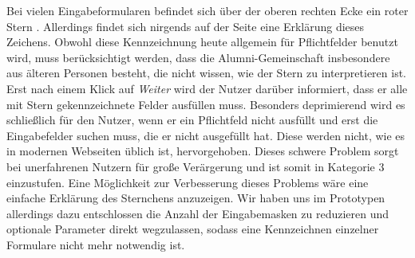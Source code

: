 { Bei vielen Eingabeformularen befindet sich über der oberen rechten Ecke ein roter Stern \glqq *\grqq. Allerdings findet sich nirgends auf der Seite eine Erklärung dieses Zeichens.
Obwohl diese Kennzeichnung heute allgemein für Pflichtfelder benutzt wird, muss berücksichtigt werden, dass die Alumni-Gemeinschaft insbesondere aus älteren Personen besteht, die nicht wissen, wie der Stern zu interpretieren ist. Erst nach einem Klick auf \emph{Weiter} wird der Nutzer darüber informiert, dass er alle mit Stern gekennzeichnete Felder ausfüllen muss.
}
{ Besonders deprimierend wird es schließlich für den Nutzer, wenn er ein Pflichtfeld nicht ausfüllt und erst die Eingabefelder suchen muss, die er nicht ausgefüllt hat. Diese werden nicht, wie es in modernen Webseiten üblich ist, hervorgehoben. Dieses schwere Problem sorgt bei unerfahrenen Nutzern für große Verärgerung und ist somit in Kategorie 3 einzustufen.
}
{ Eine Möglichkeit zur Verbesserung dieses Problems wäre eine einfache Erklärung des Sternchens anzuzeigen. Wir haben uns im Prototypen allerdings dazu entschlossen die Anzahl der Eingabemasken zu reduzieren und optionale Parameter direkt wegzulassen, sodass eine Kennzeichnen einzelner Formulare nicht mehr notwendig ist.
}

